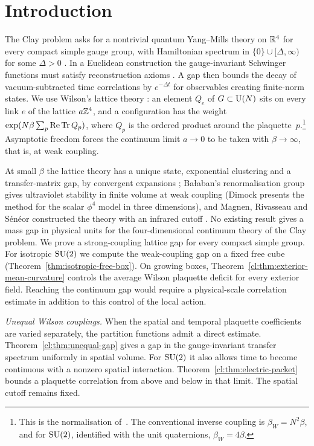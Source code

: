 \section{Introduction}\label{sec:intro}

The Clay problem asks for a nontrivial quantum Yang--Mills theory on
$\mathbb{R}^4$ for every compact simple gauge group, with Hamiltonian spectrum
in $\{0\}\cup[\Delta,\infty)$ for some $\Delta>0$ \cite{JW06}.
In a Euclidean construction the gauge-invariant Schwinger functions must
satisfy reconstruction axioms \cite{OS73,OS75}. A gap then bounds the
decay of vacuum-subtracted time correlations by $e^{-\Delta t}$ for
observables creating finite-norm states. We use Wilson's lattice theory
\cite{Wil74}: an element $Q_e$ of $G\subset\mathrm{U}(N)$ sits on every link $e$ of the
lattice $a\mathbb{Z}^4$, and a configuration has the weight
$\exp(N\beta\sum_p\operatorname{Re}\operatorname{Tr} Q_p)$, where $Q_p$ is the ordered product around the
plaquette~$p$.\footnote{This is the normalisation of~\cite{SZZ23}. The
conventional inverse coupling is $\beta_W=N^2\beta$, and for $\mathrm{SU}(2)$,
identified with the unit quaternions, $\beta_W=4\beta$.} Asymptotic freedom
forces the continuum limit $a\to0$ to be taken with $\beta\to\infty$, that is,
at weak coupling.

At small $\beta$ the lattice theory has a unique state, exponential clustering
and a transfer-matrix gap, by convergent expansions \cite{OSei78,Sei82};
Ba{\l}aban's renormalisation group \cite{Bal84a,Bal85a,Bal89b} gives ultraviolet
stability in finite volume at weak coupling (Dimock \cite{Dim13} presents the
method for the scalar $\phi^4$ model in three dimensions), and Magnen, Rivasseau and S\'en\'eor constructed the theory with an
infrared cutoff \cite{MRS93}. No existing result gives a mass gap in physical
units for the four-dimensional continuum theory of the Clay problem.
We prove a strong-coupling lattice gap for every compact simple group.
For isotropic $\mathrm{SU}(2)$ we compute the weak-coupling gap on a fixed free
cube (Theorem~\ref{thm:isotropic-free-box}). On growing boxes,
Theorem~\ref{cl:thm:exterior-mean-curvature} controls the average Wilson
plaquette deficit for every exterior field. Reaching the continuum gap
would require a physical-scale correlation estimate in addition to this
control of the local action.


\noindent\emph{Unequal Wilson couplings.}\enspace
When the spatial and temporal plaquette coefficients are varied separately,
the partition functions admit a direct estimate.
Theorem~\ref{cl:thm:unequal-gap} gives a gap in the gauge-invariant
transfer spectrum uniformly in spatial volume. For $\mathrm{SU}(2)$ it also
allows time to become continuous with a nonzero spatial interaction.
Theorem~\ref{cl:thm:electric-packet} bounds a plaquette correlation
from above and below in that limit. The spatial cutoff remains fixed.

